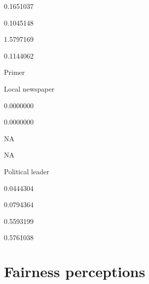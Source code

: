 \documentclass[]{book}
\begin{document}
0.1651037

0.1045148

1.5797169

0.1144062

Primer

Local newspaper

0.0000000

0.0000000

NA

NA

Political leader

0.0444304

0.0794364

0.5593199

0.5761038

\section{Fairness perceptions}\label{fairness-perceptions-1}
\end{document}
